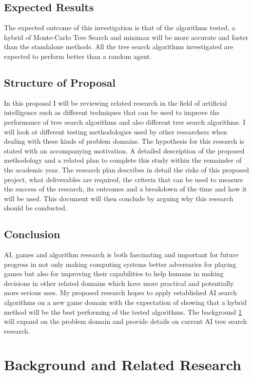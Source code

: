 \documentclass [11pt]{article}
\begin{document}
	\subsection{Expected Results}
	The expected outcome of this investigation is that of the algorithms tested, a hybrid of Monte-Carlo Tree Search and minimax will be more accurate and faster than the standalone methods. All the tree search algorithms investigated are expected to perform better than a random agent.
	
	\subsection{Structure of Proposal}
	In this proposal I will be reviewing related research in the field of artificial intelligence such as different techniques that can be used to improve the performance of tree search algorithms and also different tree search algorithms. I will look at different testing methodologies used by other researchers when dealing with these kinds of problem domains. 
	The hypothesis for this research is stated with an accompanying motivation. A detailed description of the proposed methodology and a related plan to complete this study within the remainder of the academic year. The research plan describes in detail the risks of this proposed project, what deliverables are required, the criteria that can be used to measure the success of the research, its outcomes and a breakdown of the time and how it will be used. This document will then conclude by arguing why this research should be conducted.
	
	\subsection{Conclusion}
	AI, games and algorithm research is both fascinating and important for future progress in not only making computing systems better adversaries for playing games but also for improving their capabilities to help humans in making decisions in other related domains which have more practical and potentially more serious uses. My proposed research hopes to apply established AI search algorithms on a new game domain with the expectation of showing that a hybrid method will be the best performing of the tested algorithms. The background \ref{background} will expand on the problem domain and provide details on current AI tree search research.
	
	\section{Background and Related Research}
	\label{background}
\end{document}
